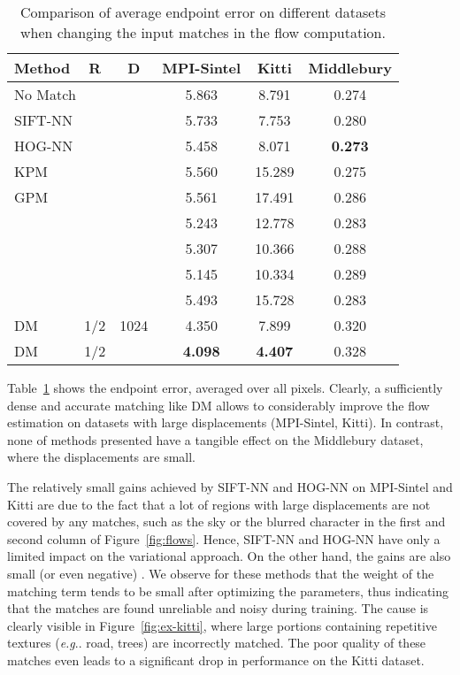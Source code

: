 \documentclass[twocolumn,natbib]{svjour3}
\makeatletter
\DeclareRobustCommand\onedot{\futurelet\@let@token\@onedot}
\def\@onedot{\ifx\@let@token.\else.\null\fi\xspace}
\def\eg{\emph{e.g}\onedot} \def\Eg{\emph{E.g}\onedot}
\newcommand{\red}[1]{{\color{black}{#1}}}
\makeatother
\begin{document}
\begin{table}
\centering
\begin{tabular}{|l|c|c||ccc|}
\hline
Method & R & D  & MPI-Sintel & Kitti & Middlebury \\
\hline 
\multicolumn{3}{|l||}{No Match}  & 5.863  & 8.791 & 0.274 \\
\hline
\multicolumn{3}{|l||}{SIFT-NN}  & 5.733  & 7.753  & 0.280  \\
\multicolumn{3}{|l||}{HOG-NN}   & 5.458  & 8.071  & \textbf{0.273}  \\
\multicolumn{3}{|l||}{KPM}      & 5.560  & 15.289  & 0.275  \\
\multicolumn{3}{|l||}{GPM}      & 5.561  & 17.491 & 0.286  \\
\multicolumn{3}{|l||}{\red{SIFT-flow}} & 5.243 & 12.778 & 0.283  \\
\multicolumn{3}{|l||}{\red{SLS}}       & 5.307 & 10.366 & 0.288  \\
\multicolumn{3}{|l||}{\red{DaisyFF}}   & 5.145 & 10.334 & 0.289  \\
\multicolumn{3}{|l||}{\red{DSP}}       & 5.493 & 15.728 & 0.283  \\
\hline
DM & 1/2 & 1024        & 4.350  & 7.899  & 0.320  \\
DM & 1/2 &     & \textbf{4.098}  & \textbf{4.407}  & 0.328  \\
\hline
\end{tabular}
\caption{Comparison of average endpoint error on different datasets when changing the input matches in the flow computation.}
\label{tab:matchfloweval} 
\end{table}

Table~\ref{tab:matchfloweval} shows the endpoint error, averaged over all pixels.
Clearly, a sufficiently dense and accurate matching like DM allows to considerably improve the flow estimation
on datasets with large displacements (MPI-Sintel, Kitti). 
In contrast, none of \red{the} methods presented have a tangible 
effect on the Middlebury dataset, where the displacements are small. 

The relatively small gains achieved by SIFT-NN and HOG-NN on MPI-Sintel and Kitti are due to the fact that
a lot of regions with large displacements are not covered by any matches, such as the 
sky or the blurred character in the first and second column of Figure~\ref{fig:flows}. Hence,
SIFT-NN and HOG-NN have only a limited impact on the variational
approach. 
On the other hand, the gains are also small (or even negative) \red{for the dense methods
despite the fact that they output significantly more correspondences}.
We observe for these methods that the weight  of the matching term tends to be small after optimizing the parameters, 
thus indicating that the matches are found unreliable and noisy during training.
The cause is clearly visible in Figure~\ref{fig:ex-kitti}, where large portions
containing repetitive textures (\eg road, trees) are incorrectly matched.
The poor quality of these matches even leads to a significant drop 
in performance on the Kitti dataset. 
\end{document}
